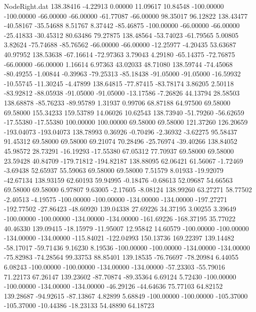 \begin{filecontents}{NodeRight.dat}
 138.38416   -4.22913    0.00000    11.09617   10.84548 -100.00000 -100.00000  -66.00000  -66.00000  -61.77087  -66.00000   98.35017   96.12822
 138.43477  -40.58167  -35.54688     8.51767    8.37442  -85.46875 -100.00000  -66.00000  -66.00000  -25.41833  -30.45312   80.63486   79.27875
 138.48564  -53.74023  -61.79565     5.00805    3.82624  -75.74688  -85.76562  -66.00000  -66.00000  -12.25977   -4.20435   53.63687   40.97952
 138.53638  -67.16614  -72.97363     3.79043    4.29180  -65.14375  -72.76875  -66.00000  -66.00000    1.16614    6.97363   43.02033   48.71080
 138.59744  -74.45068  -80.49255    -1.00844   -0.39963  -79.25313  -85.18438  -91.05000  -91.05000  -16.59932  -10.55745  -11.30245   -4.47899
 138.64815  -77.87415  -83.78174     3.86205    2.50118  -83.92812  -88.05938  -91.05000  -91.05000  -13.17586   -7.26826   44.13794   28.58503
 138.68878  -85.76233  -89.95789     1.31937    0.99706   68.87188   64.97500   69.58000   69.58000  155.34233  159.53789   14.06026   10.62543
 138.73940  -51.79260  -56.62659   -17.55380  -17.55380  100.00000  100.00000   69.58000   69.58000  121.37260  126.20659 -193.04073 -193.04073
 138.78993    0.36926   -0.70496    -2.36932   -3.62275   95.58437   91.45312   69.58000   69.58000   69.21074   70.28496  -25.76974  -39.40266
 138.84052   45.98572   28.73291   -16.19293  -17.55380   67.05312   77.70937   69.58000   69.58000   23.59428   40.84709 -179.71812 -194.82187
 138.88095   62.06421   61.56067    -1.72469   -3.69438   52.65937   55.59063   69.58000   69.58000    7.51579    8.01933  -19.92079  -42.67134
 138.93159   62.60193   59.94995    -0.18476   -0.68613   52.09687   54.66563   69.58000   69.58000    6.97807    9.63005   -2.17605   -8.08124
 138.99260   63.27271   58.77502    -2.40513   -4.19575 -100.00000 -100.00000 -134.00000 -134.00000 -197.27271 -192.77502  -27.86423  -48.60920
 139.04338   27.69226   34.37195     3.00255    3.39649 -100.00000 -100.00000 -134.00000 -134.00000 -161.69226 -168.37195   35.77022   40.46330
 139.09415  -18.15979  -11.95007    12.95842   14.60579 -100.00000 -100.00000 -134.00000 -134.00000 -115.84021 -122.04993  150.13736  169.22397
 139.14482  -58.17017  -59.71436     9.16230    8.19536 -100.00000 -100.00000 -134.00000 -134.00000  -75.82983  -74.28564   99.33753   88.85401
 139.18535  -76.76697  -78.20984     6.44055    6.08243 -100.00000 -100.00000 -134.00000 -134.00000  -57.23303  -55.79016   71.22173   67.26147
 139.23602  -87.70874  -89.35364     6.69124    5.72430 -100.00000 -100.00000 -134.00000 -134.00000  -46.29126  -44.64636   75.77103   64.82152
 139.28687  -94.92615  -87.13867     4.82899    5.68849 -100.00000 -100.00000 -105.37000 -105.37000  -10.44386  -18.23133   54.48890   64.18723

\end{filecontents}
